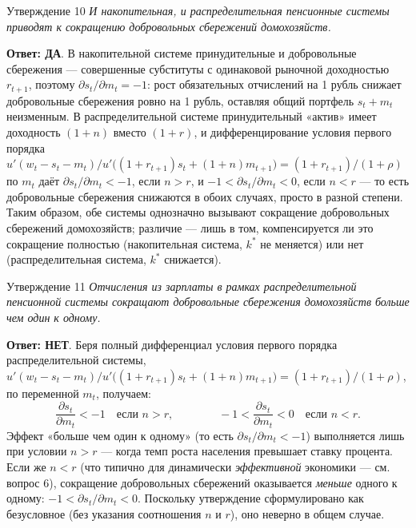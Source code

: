 \documentclass[10pt,a4paper]{article}
\newcommand{\qda}{\textbf{\color{yesgreen}Ответ: ДА}}
\newcommand{\qnet}{\textbf{\color{nored}Ответ: НЕТ}}
\newenvironment{answer}[2]{%
  \begin{qbox}{Утверждение #1}
  \textit{#2}\par\smallskip
}{%
  \end{qbox}\vspace{2pt}
}
\begin{document}
\begin{answer}{10}{И накопительная, и распределительная пенсионные системы приводят к сокращению добровольных сбережений домохозяйств.}
\qda. В накопительной системе принудительные и добровольные сбережения — совершенные субституты с одинаковой рыночной доходностью $r_{t+1}$, поэтому $\partial s_t/\partial m_t=-1$: рост обязательных отчислений на 1 рубль снижает добровольные сбережения ровно на 1 рубль, оставляя общий портфель $s_t+m_t$ неизменным. В распределительной системе принудительный «актив» имеет доходность $(1+n)$ вместо $(1+r)$, и дифференцирование условия первого порядка $u'(w_t-s_t-m_t)/u'\bigl((1+r_{t+1})s_t+(1+n)m_{t+1}\bigr)=(1+r_{t+1})/(1+\rho)$ по $m_t$ даёт $\partial s_t/\partial m_t<-1$, если $n>r$, и $-1<\partial s_t/\partial m_t<0$, если $n<r$ — то есть добровольные сбережения снижаются в обоих случаях, просто в разной степени. Таким образом, обе системы однозначно вызывают сокращение добровольных сбережений домохозяйств; различие — лишь в том, компенсируется ли это сокращение полностью (накопительная система, $k^{*}$ не меняется) или нет (распределительная система, $k^{*}$ снижается).
\end{answer}
 
\begin{answer}{11}{Отчисления из зарплаты в рамках распределительной пенсионной системы сокращают добровольные сбережения домохозяйств больше чем один к одному.}
\qnet. Беря полный дифференциал условия первого порядка распределительной системы, $u'(w_t-s_t-m_t)/u'\bigl((1+r_{t+1})s_t+(1+n)m_{t+1}\bigr)=(1+r_{t+1})/(1+\rho)$, по переменной $m_t$, получаем:
\[
\frac{\partial s_t}{\partial m_t} < -1 \quad\text{если } n>r, \qquad\qquad -1<\frac{\partial s_t}{\partial m_t}<0 \quad\text{если } n<r.
\]
Эффект «больше чем один к одному» (то есть $\partial s_t/\partial m_t<-1$) выполняется лишь при условии $n>r$ — когда темп роста населения превышает ставку процента. Если же $n<r$ (что типично для динамически \emph{эффективной} экономики — см. вопрос 6), сокращение добровольных сбережений оказывается \emph{меньше} одного к одному: $-1<\partial s_t/\partial m_t<0$. Поскольку утверждение сформулировано как безусловное (без указания соотношения $n$ и $r$), оно неверно в общем случае.
\end{answer}
 
\end{document}
